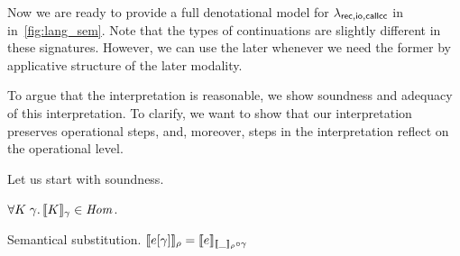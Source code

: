 Now we are ready to provide a full denotational model for $\lambda_{\mathsf{rec},\mathsf{io,callcc}}$
in \gitrees in~\cref{fig:lang_sem}. Note that the types of
continuations are slightly different in these signatures. However, we
can use the later whenever we need the former by applicative structure
of the later modality.

To argue that the interpretation is reasonable, we show soundness and
adequacy of this interpretation. To clarify, we want to show that our
interpretation preserves operational steps, and, moreover, steps in
the interpretation reflect on the operational level.

Let us start with soundness.

\begin{lemma}
  \label{lem:ectx_hom}
  $\All K\;\gamma. \sem{K}_\gamma \in \Hom$.
\end{lemma}

\begin{lemma}{Semantical substitution.}
  \label{lem:semsubst}
  $\llbracket{{e}[{\gamma}]}\rrbracket_\rho = \llbracket{e}\rrbracket_{\llbracket{\_}\rrbracket_\rho \circ \gamma}$
\end{lemma}

